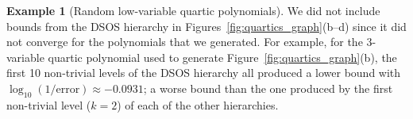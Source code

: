 \documentclass[11pt]{article}
\numberwithin{theorem}{section}
\theoremstyle{definition}
\newtheorem{example}[theorem]{Example}
\begin{document}
\begin{example}[Random low-variable quartic polynomials]
    We did not include bounds from the DSOS hierarchy in Figures~\ref{fig:quartics_graph}(b--d) since it did not converge for the polynomials that we generated. For example, for the $3$-variable quartic polynomial used to generate Figure~\ref{fig:quartics_graph}(b), the first 10 non-trivial levels of the DSOS hierarchy all produced a lower bound with $\log_{10}(1/\text{error}) \approx -0.0931$; a worse bound than the one produced by the first non-trivial level ($k=2$) of each of the other hierarchies.



\end{example}
\end{document}
